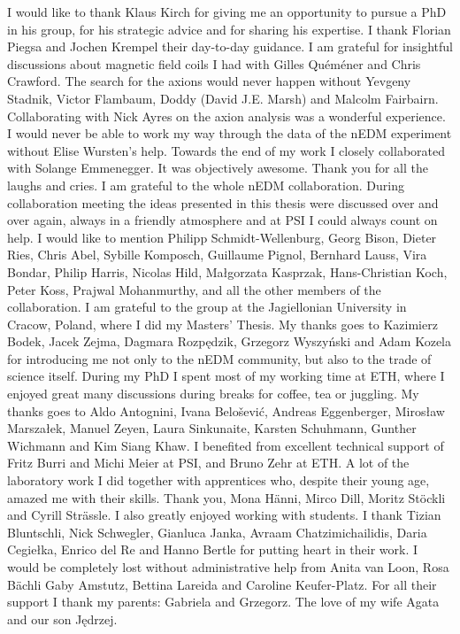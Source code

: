 I would like to thank Klaus Kirch for giving me an opportunity to pursue a PhD in his group, for his strategic advice and for sharing his expertise.
I thank Florian Piegsa and Jochen Krempel their day-to-day guidance.
I am grateful for insightful discussions about magnetic field coils I had with Gilles Quéméner and Chris Crawford. The search for the axions would never happen without Yevgeny Stadnik, Victor Flambaum, Doddy (David J.E. Marsh) and Malcolm Fairbairn. Collaborating with Nick Ayres on the axion analysis was a wonderful experience. I would never be able to work my way through the data of the nEDM experiment without Elise Wursten's help. Towards the end of my work I closely collaborated with Solange Emmenegger. It was objectively awesome. Thank you for all the laughs and cries. I am grateful to the whole nEDM collaboration. During collaboration meeting the ideas presented in this thesis were discussed over and over again, always in a friendly atmosphere and at PSI I could always count on help. I would like to mention
Philipp Schmidt-Wellenburg,
Georg Bison,
Dieter Ries,
Chris Abel,
Sybille Komposch,
Guillaume Pignol,
Bernhard Lauss,
Vira Bondar,
Philip Harris,
Nicolas Hild,
Małgorzata Kasprzak,
Hans-Christian Koch,
Peter Koss,
Prajwal Mohanmurthy,
and all the other members of the collaboration.
I am grateful to the group at the Jagiellonian University in Cracow, Poland, where I did my Masters' Thesis. My thanks goes to
Kazimierz Bodek,
Jacek Zejma,
Dagmara Rozpędzik,
Grzegorz Wyszyński and
Adam Kozela
for introducing me not only to the nEDM community, but also to the trade of science itself. During my PhD I spent most of my working time at ETH, where I enjoyed great many discussions during breaks for coffee, tea or juggling. My thanks goes to
Aldo Antognini,
Ivana Belo\v{s}ević,
Andreas Eggenberger,
Mirosław Marszałek,
Manuel Zeyen,
Laura Sinkunaite,
Karsten Schuhmann,
Gunther Wichmann and
Kim Siang Khaw.
I benefited from excellent technical support of Fritz Burri and Michi Meier at PSI, and Bruno Zehr at ETH\@. A lot of the laboratory work I did together with apprentices who, despite their young age, amazed me with their skills. Thank you,
Mona Hänni,
Mirco Dill,
Moritz Stöckli and
Cyrill Strässle.
I also greatly enjoyed working with students. I thank
Tizian Bluntschli,
Nick Schwegler,
Gianluca Janka,
Avraam Chatzimichailidis,
Daria Cegiełka,
Enrico del Re and
Hanno Bertle for putting heart in their work.
I would be completely lost without administrative help from Anita van Loon, Rosa Bächli
Gaby Amstutz, Bettina Lareida and Caroline Keufer-Platz. For all their support I thank my parents: Gabriela and Grzegorz. The love of my wife Agata and our son Jędrzej. 




